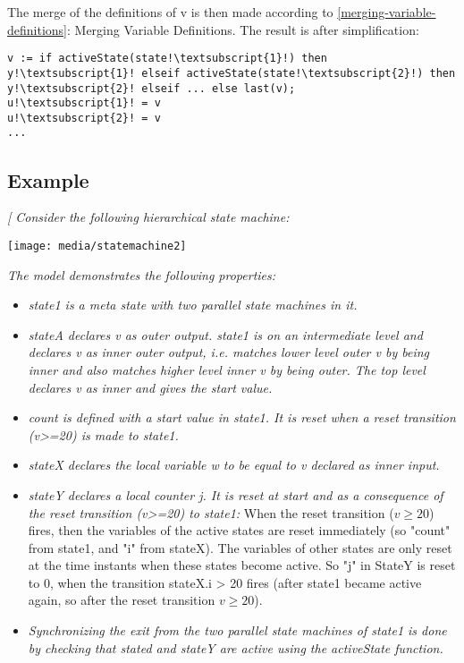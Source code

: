 The merge of the definitions of v is then made according to \ref{merging-variable-definitions}: 
Merging Variable Definitions. The result is after
simplification:
\begin{lstlisting}[language=modelica,escapechar=!]
v := if activeState(state!\textsubscript{1}!) then y!\textsubscript{1}! elseif activeState(state!\textsubscript{2}!) then y!\textsubscript{2}! elseif ... else last(v); 
u!\textsubscript{1}! = v
u!\textsubscript{2}! = v
...
\end{lstlisting}

\subsection{Example}

\emph{{[} Consider the following hierarchical state machine:}

\texttt{[image: media/statemachine2]}

\emph{The model demonstrates the following properties:}

\begin{itemize}
\item
  \emph{state1 is a meta state with two parallel state machines in it. }
\item
  \emph{stateA declares v as outer output. state1 is on an intermediate
  level and declares v as inner outer output, i.e. matches lower level
  outer v by being inner and also matches higher level inner v by being
  outer. The top level declares v as inner and gives the start value.}
\item
  \emph{count is defined with a start value in state1. It is reset when
  a reset transition (v\textgreater{}=20) is made to state1.}
\item
  \emph{stateX declares the local variable w to be equal to v declared
  as inner input.}
\item
  \emph{stateY declares a local counter j. It is reset at start and as a
  consequence of the reset transition (v\textgreater{}=20) to state1:}
  When the reset transition ($v\ge 20$) fires, then the variables of the
  active states are reset immediately (so "count" from state1, and "i"
  from stateX). The variables of other states are only reset at the time
  instants when these states become active. So "j" in StateY is reset to
  0, when the transition stateX.i \textgreater{} 20 fires (after state1
  became active again, so after the reset transition $v\ge 20$).
\item
  \emph{Synchronizing the exit from the two parallel state machines of
  state1 is done by checking that stated and stateY are active using the
  activeState function. }
\end{itemize}

